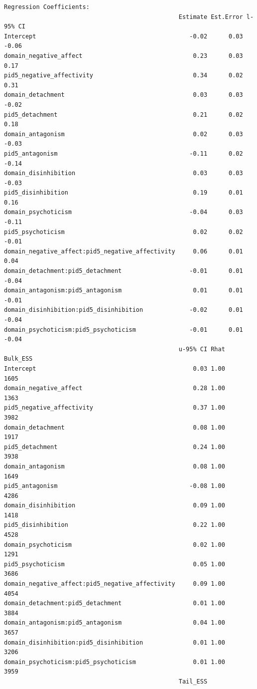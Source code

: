 \documentclass[
  11pt,
  a4paper,
  onecolumn]{article}
\begin{document}
\begin{verbatim}
Regression Coefficients:
                                                 Estimate Est.Error l-95% CI
Intercept                                           -0.02      0.03    -0.06
domain_negative_affect                               0.23      0.03     0.17
pid5_negative_affectivity                            0.34      0.02     0.31
domain_detachment                                    0.03      0.03    -0.02
pid5_detachment                                      0.21      0.02     0.18
domain_antagonism                                    0.02      0.03    -0.03
pid5_antagonism                                     -0.11      0.02    -0.14
domain_disinhibition                                 0.03      0.03    -0.03
pid5_disinhibition                                   0.19      0.01     0.16
domain_psychoticism                                 -0.04      0.03    -0.11
pid5_psychoticism                                    0.02      0.02    -0.01
domain_negative_affect:pid5_negative_affectivity     0.06      0.01     0.04
domain_detachment:pid5_detachment                   -0.01      0.01    -0.04
domain_antagonism:pid5_antagonism                    0.01      0.01    -0.01
domain_disinhibition:pid5_disinhibition             -0.02      0.01    -0.04
domain_psychoticism:pid5_psychoticism               -0.01      0.01    -0.04
                                                 u-95% CI Rhat Bulk_ESS
Intercept                                            0.03 1.00     1605
domain_negative_affect                               0.28 1.00     1363
pid5_negative_affectivity                            0.37 1.00     3982
domain_detachment                                    0.08 1.00     1917
pid5_detachment                                      0.24 1.00     3938
domain_antagonism                                    0.08 1.00     1649
pid5_antagonism                                     -0.08 1.00     4286
domain_disinhibition                                 0.09 1.00     1418
pid5_disinhibition                                   0.22 1.00     4528
domain_psychoticism                                  0.02 1.00     1291
pid5_psychoticism                                    0.05 1.00     3686
domain_negative_affect:pid5_negative_affectivity     0.09 1.00     4054
domain_detachment:pid5_detachment                    0.01 1.00     3884
domain_antagonism:pid5_antagonism                    0.04 1.00     3657
domain_disinhibition:pid5_disinhibition              0.01 1.00     3206
domain_psychoticism:pid5_psychoticism                0.01 1.00     3959
                                                 Tail_ESS

\end{verbatim}
\end{document}
